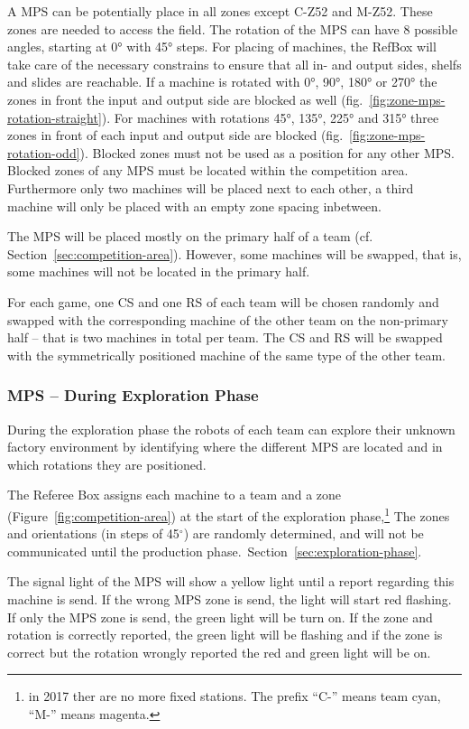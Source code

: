 \documentclass[12pt,twoside]{article}
\newcommand{\refsec}[1]{Section~\ref{#1}}
\newcommand{\reffig}[1]{Figure~\ref{#1}}
\begin{document}
A MPS can be potentially place in all zones except C-Z52 and M-Z52. These zones are needed to access the field.
The rotation of the MPS can have 8 possible angles, starting at \ang{0} with \ang{45} steps.
For placing of machines, the RefBox will take care of the necessary constrains to ensure that all in- and output sides, shelfs and slides are reachable.
If a machine is rotated with \ang{0}, \ang{90}, \ang{180} or \ang{270} the zones in front the input and output side are blocked as well (fig.~\ref{fig:zone-mps-rotation-straight}).
For machines with rotations \ang{45}, \ang{135}, \ang{225} and \ang{315} three zones in front of each input and output side are blocked (fig.~\ref{fig:zone-mps-rotation-odd}).
Blocked zones must not be used as a position for any other MPS. Blocked zones of any MPS must be located within the competition area.
Furthermore only two machines will be placed next to each other, a third machine will only be placed with an empty zone spacing inbetween.

The MPS will be placed mostly on the primary half of a team
(cf. \refsec{sec:competition-area}). However, some machines will be
swapped, that is, some machines will not be located in the primary
half.

For each game, one CS and one RS of each team will be chosen randomly
and swapped with the corresponding machine of the other team on the
non-primary half -- that is two machines in total per team. The CS and
RS will be swapped with the symmetrically positioned machine of the
same type of the other team.

\subsubsection{MPS -- During Exploration Phase}
\label{sec:production-machines-exp}
During the exploration phase the robots of each team can explore their
unknown factory environment by identifying where the different MPS are
located and in which rotations they are positioned.

The Referee Box assigns each machine to a team and a zone
(\reffig{fig:competition-area}) at the start of the exploration
phase,\footnote{in 2017 ther are no more fixed stations. The prefix ``C-'' means team 
cyan, ``M-'' means magenta.} 
The zones and orientations (in steps of 45$^\circ$) are randomly determined,  and will not be 
communicated until the production phase.~\refsec{sec:exploration-phase}.

The signal light of the MPS will show a yellow light until a report regarding this machine is send.
If the wrong MPS zone is send, the light will start red flashing.
If only the MPS zone is send, the green light will be turn on.
If the zone and rotation is correctly reported, the green light will be flashing and if the zone is correct but the rotation wrongly reported the red and green light will be on.
\end{document}
